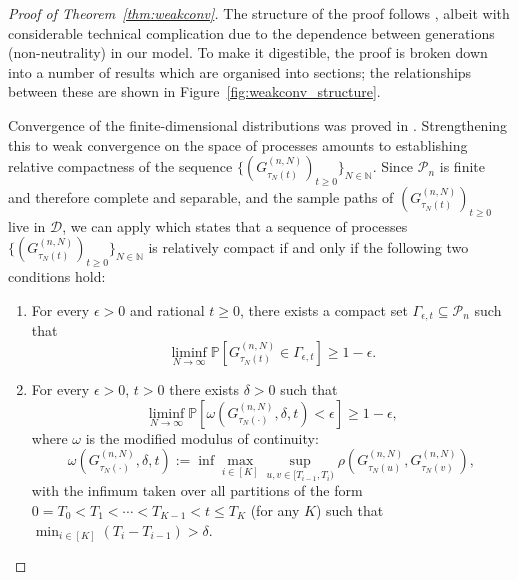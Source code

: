 \documentclass[12pt,authoryear]{article}
\theoremstyle{definition}
\newcommand{\Prob}{\mathbb{P}}
\newcommand{\1}[1]{\mathbbm{1}_{#1}}
\begin{document}
\begin{proof}[Proof of Theorem~\ref{thm:weakconv}]
The structure of the proof follows \citet{mohle1999}, albeit with considerable technical complication due to the dependence between generations (non-neutrality) in our model.
To make it digestible, the proof is broken down into a number of results which are organised into sections; the relationships between these are shown in Figure~\ref{fig:weakconv_structure}.

Convergence of the finite-dimensional distributions was proved in \citet[Theorem 3.2]{brown2021}.
Strengthening this to weak convergence on the space of processes amounts to establishing relative compactness of the sequence $\{ (G_{\tau_N(t)}^{(n,N)})_{t\geq0} \}_{N\in\mathbb{N}}$.
Since $\mathcal{P}_n$ is finite and therefore complete and separable, and the sample paths of $(G_{\tau_N(t)}^{(n,N)})_{t\geq0}$ live in $\mathcal{D}$, we can apply \citet[Chapter 3, Corollary 7.4]{ethier1986} which states that a sequence of processes $\{ (G_{\tau_N(t)}^{(n,N)})_{t\geq0} \}_{N\in\mathbb{N}}$ is relatively compact if and only if the following two conditions hold:
\begin{enumerate}
\item \label{item:relcomp1} For every $\epsilon>0$ and rational $t\geq 0$, there exists a compact set $\Gamma_{ \epsilon, t } \subseteq \mathcal{P}_n$ such that
\begin{equation*}
\liminf_{N\to\infty} \Prob\left[ G_{\tau_N(t)}^{(n,N)} \in \Gamma_{ \epsilon, t } \right] 
\geq 1-\epsilon.
\end{equation*}
\item \label{item:relcomp2} For every $\epsilon>0$, $t>0$ there exists $\delta>0$ such that
\begin{equation}\label{modulus_of_continuity}
\liminf_{N\to\infty} \Prob\left[ \omega\left( G_{\tau_N(\cdot)}^{(n,N)}, \delta, t \right) < \epsilon \right] 
\geq 1-\epsilon,
\end{equation}
where $\omega$ is the modified modulus of continuity:
\begin{equation*}
\omega\left( G_{\tau_N(\cdot)}^{(n,N)}, \delta, t \right) := \inf \max_{i \in [K]} 
        \sup_{u,v \in [T_{i-1}, T_i)} \rho\left( 
        G_{\tau_N(u)}^{(n,N)}, G_{\tau_N(v)}^{(n,N)} \right),
\end{equation*}
with the infimum taken over all partitions of the form $0=T_0<T_1<\cdots <T_{K-1} <t \leq T_K$ (for any $K$) such that $\min_{i\in[K]} (T_i - T_{i-1}) > \delta$. 
\end{enumerate}

\end{proof}
\end{document}
